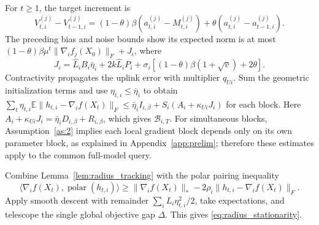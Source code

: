 \begin{codex}
\begin{paperproof}
For $t\ge1$, the target increment is
\[
 V_{t,i}^{(j)}-V_{t-1,i}^{(j)}
 =(1-\theta)\beta(a_{t,i}^{(j)}-M_{t,i}^{(j)})
       +\theta(a_{t,i}^{(j)}-a_{t-1,i}^{(j)}).
\]
The preceding bias and noise bounds show its expected norm is at most
$(1-\theta)\beta\mu^t\|\nabla_i f_j(X_0)\|_F+J_i$, where
\[
 J_i=\widehat L_iB_i\bar\eta_i+2k\widehat L_iP_i
       +\sigma_i[(1-\theta)\beta(1+\sqrt v)+2\theta].
\]
Contractivity propagates the uplink error with multiplier $q_{Ui}$.
Sum the geometric initialization terms and use
$\eta_{t,i}\le\bar\eta_i$ to obtain
$\sum_t\eta_{t,i}\mathbb E\|h_{t,i}-\nabla_i f(X_t)\|_F
 \le\bar\eta_i I_{i,\beta}+S_i(A_i+\kappa_{Ui}J_i)$ for each block.
Here $A_i+\kappa_{Ui}J_i=\bar\eta_iD_{i,\beta}+R_{i,\beta}$,
which gives $\mathcal B_{i,T}$.
For simultaneous blocks, Assumption~\ref{as:2} implies each local
gradient block depends only on its own parameter block, as explained in
Appendix~\ref{app:prelim}; therefore these estimates apply to the common
full-model query.
\end{paperproof}

\begin{paperproof}
Combine Lemma~\ref{lem:radius_tracking} with the polar pairing inequality
\[
 \langle\nabla_i f(X_t),\operatorname{polar}(h_{t,i})\rangle
 \ge\|\nabla_i f(X_t)\|_*
       -2\rho_i\|h_{t,i}-\nabla_i f(X_t)\|_F.
\]
Apply smooth descent with remainder $\sum_iL_i\eta_{t,i}^2/2$,
take expectations, and telescope the single global objective gap
$\Delta$. This gives \eqref{eq:radius_stationarity}.
\end{paperproof}


\end{codex}
